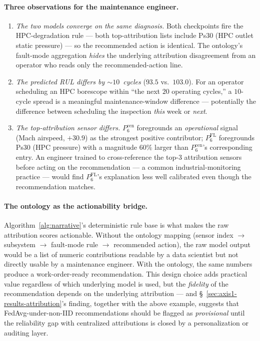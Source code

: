 \documentclass[preprint,12pt,authoryear]{elsarticle}
\begin{document}
\paragraph{Three observations for the maintenance engineer.}
\begin{enumerate}
    \item \emph{The two models converge on the same diagnosis.} Both checkpoints fire the HPC-degradation rule --- both top-attribution lists include Ps30 (HPC outlet static pressure) --- so the recommended action is identical. The ontology's fault-mode aggregation \emph{hides} the underlying attribution disagreement from an operator who reads only the recommended-action line.
    \item \emph{The predicted RUL differs by $\sim 10$~cycles} ($93.5$ vs.\ $103.0$). For an operator scheduling an HPC borescope within ``the next $20$ operating cycles,'' a $10$-cycle spread is a meaningful maintenance-window difference --- potentially the difference between scheduling the inspection \emph{this} week or \emph{next}.
    \item \emph{The top-attribution sensor differs.} $P_6^{\mathrm{cen}}$ foregrounds an \emph{operational} signal (Mach airspeed, $+30.9$) as the strongest positive contributor; $P_6^{\mathrm{FL}}$ foregrounds Ps30 (HPC pressure) with a magnitude $60\%$ larger than $P_6^{\mathrm{cen}}$'s corresponding entry. An engineer trained to cross-reference the top-3 attribution sensors before acting on the recommendation --- a common industrial-monitoring practice --- would find $P_6^{\mathrm{FL}}$'s explanation less well calibrated even though the recommendation matches.
\end{enumerate}

\paragraph{The ontology as the actionability bridge.}
Algorithm~\ref{alg:narrative}'s deterministic rule base is what makes
the raw attribution scores actionable. Without the ontology mapping
(sensor index $\to$ subsystem $\to$ fault-mode rule $\to$ recommended
action), the raw model output would be a list of numeric contributions
readable by a data scientist but not directly usable by a maintenance
engineer. With the ontology, the same numbers produce a work-order-ready
recommendation. This design choice adds practical value regardless of
which underlying model is used, but the \emph{fidelity} of the
recommendation depends on the underlying attribution --- and
\S~\ref{sec:axis1-results-attribution}'s finding, together with the
above example, suggests that FedAvg-under-non-IID recommendations should
be flagged as \emph{provisional} until the reliability gap with
centralized attributions is closed by a personalization or auditing
layer.
\end{document}
